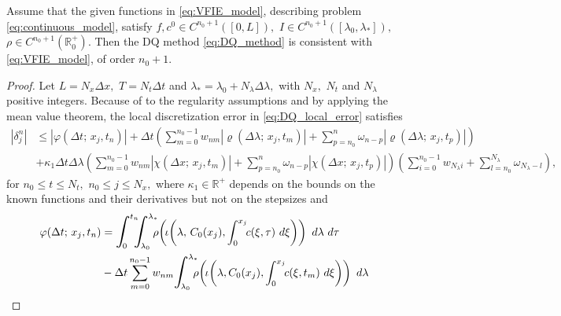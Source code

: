 \documentclass[a4paper, UKenglish, numberwithinsect, thm-restate]{tgdk-v2021}
\begin{document}
\begin{lemma}\label{lemma:DQ_Cons}
    Assume that the given functions in \eqref{eq:VFIE_model}, describing problem \eqref{eq:continuous_model}, satisfy $f,c^0\in C^{n_0+1}([0,L]),$ $I\in C^{n_0+1}([\lambda_{0},\lambda_{*}]),$ $\rho\in C^{n_0+1}(\mathbb{R}^+_0).$ Then the DQ method \eqref{eq:DQ_method} is consistent with \eqref{eq:VFIE_model}, of order $n_0+1$. 
\end{lemma}

\begin{proof}
    Let $L=N_x \Delta x,$ $T=N_t \Delta t$ and $\lambda_{*} =\lambda_{0}+ N_\lambda \Delta \lambda,$ with $N_x,$ $N_t$ and $N_\lambda$ positive integers. Because of to the regularity assumptions and by applying the mean value theorem, the local discretization error in \eqref{eq:DQ_local_error} satisfies 
    \begin{equation}\label{eq:partial_bound_DQ_cons}
        \begin{split}
             |\delta_j^n|&\leq |\varphi (\Delta t;  \, x_j, t_n)|+\Delta t\left( \sum_{m=0}^{n_0-1} w_{n m} |\varrho(\Delta \lambda;  \, x_j, t_{m})| + \sum_{p=n_0}^{n} \omega_{n-p} |\varrho(\Delta \lambda;  \, x_j, t_{p})| \right) \\
             &+\kappa_1 \Delta t \Delta \lambda 
             \left(\sum_{m=0}^{n_0-1} w_{n m}|\chi(\Delta x;  \, x_j, t_{m})|+\sum_{p=n_0}^{n}  \omega_{n-p}|\chi(\Delta x;  \, x_j, t_{p})|\right)
             \left( \sum_{i=0}^{n_0-1} w_{N_\lambda i}  + \sum_{l=n_0}^{N_\lambda} \omega_{N_\lambda-l} \right),
        \end{split}
    \end{equation}
    for $n_0\leq t\leq N_t,$ $n_0\leq j\leq N_x,$ where $\kappa_1\in \mathbb{R}^+$ depends on the bounds on the known functions and their derivatives but not on the stepsizes and 
    \begin{equation*}
        \begin{split}
            \varphi (\Delta t;  \, x_j, t_n)&= \scalebox{1.3}{$\displaystyle\int$}_{\!\!\!\!\! 0}^{t_n} \!\!\! \scalebox{1.3}{$\displaystyle\int$}_{\!\!\!\!\! \lambda_{0}}^{\lambda_{*}} \!\!\! \rho \! \left( \! \iota \! \left(\lambda,\, C_0(x_j), \int_0^{x_j} \!\! c(\xi,\tau)  \ d\xi\right)\right) \ d\lambda \ d \tau \\
            &- \Delta t\sum_{m=0}^{n_0-1} w_{n m} \scalebox{1.3}{$\displaystyle\int$}_{\!\!\!\!\! \lambda_0}^{\lambda_*} \!\!\! \rho \! \left( \! \iota \! \left(\lambda, C_0(x_j) , \int_0^{x_j} \!\! c(\xi,t_m)  \ d\xi \right) \right) \ d\lambda \\

\end{split}
\end{equation*}
\end{proof}
\end{document}
